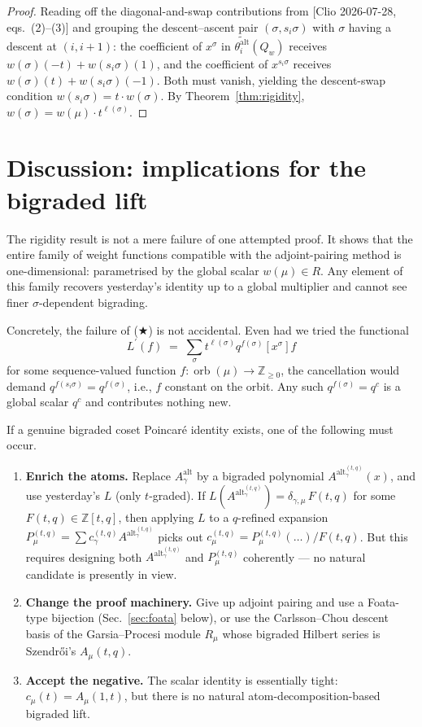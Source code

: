 \documentclass[11pt]{article}
\theoremstyle{definition}
\theoremstyle{remark}
\newcommand{\orb}{\operatorname{orb}}
\newcommand{\Aalt}{A^{\mathrm{alt}}}
\newcommand{\thetaalt}{\theta^{\mathrm{alt}}}
\begin{document}
\begin{proof}
Reading off the diagonal-and-swap contributions from
[Clio 2026-07-28, eqs.\ (2)--(3)] and grouping the descent--ascent pair
$(\sigma, s_i\sigma)$ with $\sigma$ having a descent at $(i,i+1)$: the
coefficient of $x^\sigma$ in $\widetilde{\thetaalt_i}(Q_w)$ receives
$w(\sigma)(-t) + w(s_i\sigma)(1)$, and the coefficient of $x^{s_i\sigma}$
receives $w(\sigma)(t) + w(s_i\sigma)(-1)$. Both must vanish, yielding the
descent-swap condition $w(s_i \sigma) = t \cdot w(\sigma)$. By
Theorem~\ref{thm:rigidity}, $w(\sigma) = w(\mu) \cdot t^{\ell(\sigma)}$.
\end{proof}

\section{Discussion: implications for the bigraded lift}

The rigidity result is not a mere failure of one attempted proof. It shows
that the entire family of weight functions compatible with the
adjoint-pairing method is one-dimensional: parametrised by the global scalar
$w(\mu) \in R$. Any element of this family recovers yesterday's identity up
to a global multiplier and cannot see finer $\sigma$-dependent bigrading.

Concretely, the failure of (★) is not accidental. Even had we tried the
functional
\[
  L^{\prime}(f) \;=\; \sum_\sigma t^{\ell(\sigma)} q^{f(\sigma)}[x^\sigma] f
\]
for some sequence-valued function $f: \orb(\mu) \to \mathbb Z_{\ge 0}$, the
cancellation would demand $q^{f(s_i\sigma)} = q^{f(\sigma)}$, i.e., $f$ constant
on the orbit. Any such $q^{f(\sigma)} = q^{c}$ is a global scalar $q^c$ and
contributes nothing new.

If a genuine bigraded coset Poincar\'e identity exists, one of the following
must occur.

\begin{enumerate}
\item \textbf{Enrich the atoms.} Replace $\Aalt_\gamma$ by a bigraded
      polynomial $\Aalt^{(t,q)}_\gamma(x)$, and use yesterday's $L$ (only
      $t$-graded). If $L(\Aalt^{(t,q)}_\gamma) = \delta_{\gamma,\mu}\, F(t,q)$
      for some $F(t,q) \in \mathbb Z[t,q]$, then applying $L$ to a
      $q$-refined expansion $P^{(t,q)}_\mu = \sum c^{(t,q)}_\gamma \Aalt^{(t,q)}_\gamma$
      picks out $c^{(t,q)}_\mu = P^{(t,q)}_\mu(\dots) / F(t,q)$. But this
      requires designing both $\Aalt^{(t,q)}_\gamma$ and $P^{(t,q)}_\mu$
      coherently — no natural candidate is presently in view.
\item \textbf{Change the proof machinery.} Give up adjoint pairing and use
      a Foata-type bijection (Sec.\ \ref{sec:foata} below), or use the
      Carlsson--Chou descent basis of the Garsia--Procesi module $R_\mu$
      whose bigraded Hilbert series is Szendr\H{o}i's $A_\mu(t,q)$.
\item \textbf{Accept the negative.} The scalar identity is essentially
      tight: $c_\mu(t) = A_\mu(1,t)$, but there is no natural
      atom-decomposition-based bigraded lift.
\end{enumerate}
\end{document}
